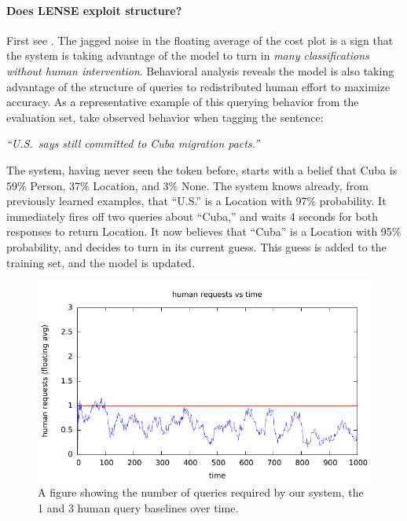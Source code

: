 \paragraph{Does LENSE exploit structure?}
First see .
The jagged noise in the floating average of the cost plot is a sign that the system is taking advantage of the model to turn in {\em many classifications without human intervention}.
Behavioral analysis reveals the model is also taking advantage of the structure of queries to redistributed human effort to maximize accuracy.
As a representative example of this querying behavior from the evaluation set, take observed behavior when tagging the sentence:

\begin{center}
\textit{``U.S.\ says still committed to Cuba migration pacts.''}
\end{center}

The system, having never seen the token before, starts with a belief that Cuba is 59\% Person, 37\% Location, and 3\% None. The system knows already, from previously learned examples, that ``U.S.'' is a Location with 97\% probability. It immediately fires off two queries about ``Cuba,'' and waits 4 seconds for both responses to return Location. It now believes that ``Cuba'' is a Location with 95\% probability, and decides to turn in its current guess. This guess is added to the training set, and the model is updated.

\begin{figure}[t]
  \begin{centering}
  \includegraphics[width=1.0\textwidth]{figures/ner_2_class/cost_plot/cost_vs_time.pdf}
  \end{centering}
  \caption{A figure showing the number of queries required by our system, the 1 and 3 human query baselines over time.}
\label{fig:ner-cost}
\end{figure}

